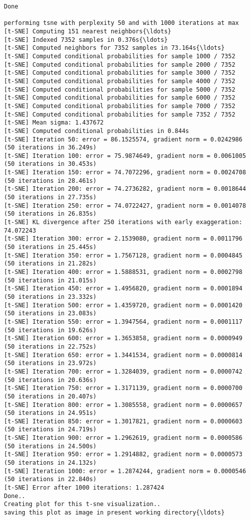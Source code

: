 \documentclass[11pt]{article}
\begin{document}
    \begin{Verbatim}[commandchars=\\\{\}]
Done

performing tsne with perplexity 50 and with 1000 iterations at max
[t-SNE] Computing 151 nearest neighbors{\ldots}
[t-SNE] Indexed 7352 samples in 0.376s{\ldots}
[t-SNE] Computed neighbors for 7352 samples in 73.164s{\ldots}
[t-SNE] Computed conditional probabilities for sample 1000 / 7352
[t-SNE] Computed conditional probabilities for sample 2000 / 7352
[t-SNE] Computed conditional probabilities for sample 3000 / 7352
[t-SNE] Computed conditional probabilities for sample 4000 / 7352
[t-SNE] Computed conditional probabilities for sample 5000 / 7352
[t-SNE] Computed conditional probabilities for sample 6000 / 7352
[t-SNE] Computed conditional probabilities for sample 7000 / 7352
[t-SNE] Computed conditional probabilities for sample 7352 / 7352
[t-SNE] Mean sigma: 1.437672
[t-SNE] Computed conditional probabilities in 0.844s
[t-SNE] Iteration 50: error = 86.1525574, gradient norm = 0.0242986 (50 iterations in 36.249s)
[t-SNE] Iteration 100: error = 75.9874649, gradient norm = 0.0061005 (50 iterations in 30.453s)
[t-SNE] Iteration 150: error = 74.7072296, gradient norm = 0.0024708 (50 iterations in 28.461s)
[t-SNE] Iteration 200: error = 74.2736282, gradient norm = 0.0018644 (50 iterations in 27.735s)
[t-SNE] Iteration 250: error = 74.0722427, gradient norm = 0.0014078 (50 iterations in 26.835s)
[t-SNE] KL divergence after 250 iterations with early exaggeration: 74.072243
[t-SNE] Iteration 300: error = 2.1539080, gradient norm = 0.0011796 (50 iterations in 25.445s)
[t-SNE] Iteration 350: error = 1.7567128, gradient norm = 0.0004845 (50 iterations in 21.282s)
[t-SNE] Iteration 400: error = 1.5888531, gradient norm = 0.0002798 (50 iterations in 21.015s)
[t-SNE] Iteration 450: error = 1.4956820, gradient norm = 0.0001894 (50 iterations in 23.332s)
[t-SNE] Iteration 500: error = 1.4359720, gradient norm = 0.0001420 (50 iterations in 23.083s)
[t-SNE] Iteration 550: error = 1.3947564, gradient norm = 0.0001117 (50 iterations in 19.626s)
[t-SNE] Iteration 600: error = 1.3653858, gradient norm = 0.0000949 (50 iterations in 22.752s)
[t-SNE] Iteration 650: error = 1.3441534, gradient norm = 0.0000814 (50 iterations in 23.972s)
[t-SNE] Iteration 700: error = 1.3284039, gradient norm = 0.0000742 (50 iterations in 20.636s)
[t-SNE] Iteration 750: error = 1.3171139, gradient norm = 0.0000700 (50 iterations in 20.407s)
[t-SNE] Iteration 800: error = 1.3085558, gradient norm = 0.0000657 (50 iterations in 24.951s)
[t-SNE] Iteration 850: error = 1.3017821, gradient norm = 0.0000603 (50 iterations in 24.719s)
[t-SNE] Iteration 900: error = 1.2962619, gradient norm = 0.0000586 (50 iterations in 24.500s)
[t-SNE] Iteration 950: error = 1.2914882, gradient norm = 0.0000573 (50 iterations in 24.132s)
[t-SNE] Iteration 1000: error = 1.2874244, gradient norm = 0.0000546 (50 iterations in 22.840s)
[t-SNE] Error after 1000 iterations: 1.287424
Done..
Creating plot for this t-sne visualization..
saving this plot as image in present working directory{\ldots}

    \end{Verbatim}
\end{document}
